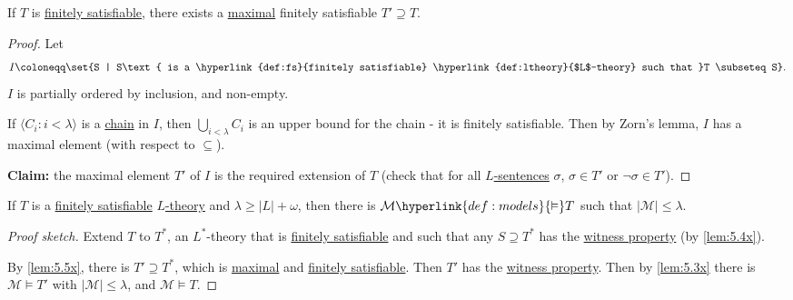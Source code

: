\documentclass{article}
\let\models\vDash
\begin{document}
\begin{nlemma}\label{lem:5.5x}
  If $T$ is \hyperlink{def:fs}{finitely satisfiable}, there exists a \hyperlink{def:maximal}{maximal} finitely satisfiable $T' \supseteq T$.
\end{nlemma}
\begin{proof}
  Let
  \begin{equation*}
    I \coloneqq \set{S | S\text{ is a \hyperlink{def:fs}{finitely satisfiable} \hyperlink{def:ltheory}{$L$-theory} such that }T \subseteq S}.
  \end{equation*}
  $I$ is partially ordered by inclusion, and non-empty.

  If $\langle C_i : i < \lambda \rangle$ is a \hyperlink{def:chain}{chain} in $I$, then $\bigcup_{i < \lambda} C_i$ is an upper bound for the chain - it is finitely satisfiable.
  Then by Zorn's lemma, $I$ has a maximal element (with respect to $\subseteq$).

  \textbf{Claim:} the maximal element $T'$ of $I$ is the required extension of $T$ (check that for all \hyperlink{def:sentence}{$L$-sentences} $\sigma$, $\sigma \in T'$ or $\lnot \sigma \in T'$).
\end{proof}
\begin{nthm}[Compactness]\label{thm:5.6x}
  If $T$ is a \hyperlink{def:fs}{finitely satisfiable} \hyperlink{def:ltheory}{$L$-theory} and $\lambda \geq |L| + \omega$, then there is $\mathcal{M} \hyperlink{def:models}{\models} T$ such that $|\mathcal{M}| \leq \lambda$.
\end{nthm}
\begin{proof}[Proof sketch]
  Extend $T$ to $T^*$, an $L^*$-theory that is \hyperlink{def:fs}{finitely satisfiable} and such that any $S \supseteq T^*$ has the \hyperlink{def:wp}{witness property} (by \cref{lem:5.4x}).

  By \cref{lem:5.5x}, there is $T' \supseteq T^*$, which is \hyperlink{def:maximal}{maximal} and \hyperlink{def:fs}{finitely satisfiable}.
  Then $T'$ has the \hyperlink{def:wp}{witness property}.
  Then by \cref{lem:5.3x} there is $\mathcal{M} \models T'$ with $|\mathcal{M}| \leq \lambda$, and $\mathcal{M} \models T$.
\end{proof}

\printindex
\end{document}
